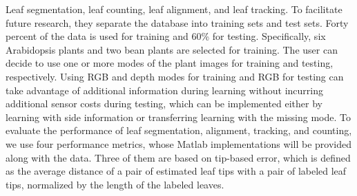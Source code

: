 Leaf segmentation, leaf counting, leaf alignment, and leaf tracking. To facilitate future research, they separate the database into training sets and test sets.
Forty percent of the data is used for training and 60\% for testing. Specifically, six Arabidopsis plants and two bean plants are selected for training. The user
can decide to use one or more modes of the plant images for training and testing, respectively. Using RGB and depth modes for training and RGB for testing can
take advantage of additional information during learning without incurring additional sensor costs during testing, which can be implemented either by learning
with side information or transferring learning with the missing mode. To evaluate the performance of leaf segmentation, alignment, tracking, and counting, we
use four performance metrics, whose Matlab implementations will be provided along with the data. Three of them are based on tip-based error, which is defined
as the average distance of a pair of estimated leaf tips with a pair of labeled leaf tips, normalized by the length of the labeled leaves.

